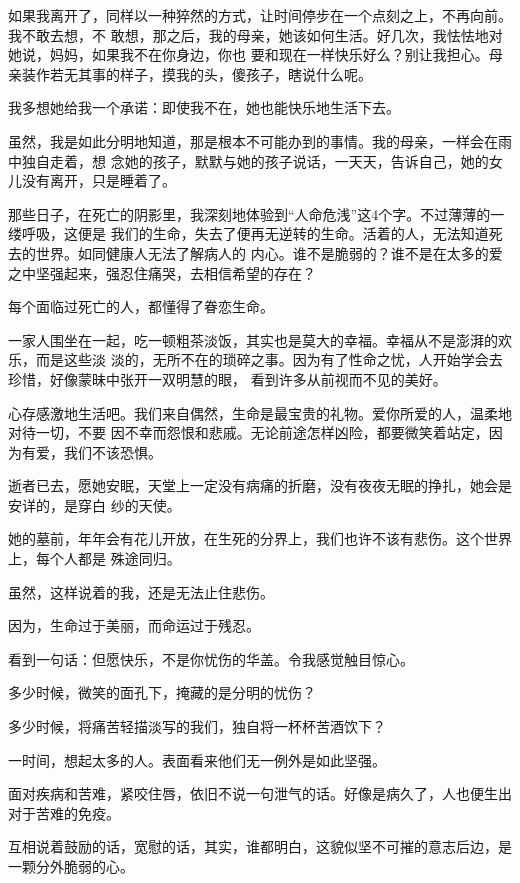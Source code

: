 		如果我离开了，同样以一种猝然的方式，让时间停步在一个点刻之上，不再向前。我不敢去想，不
	敢想，那之后，我的母亲，她该如何生活。好几次，我怯怯地对她说，妈妈，如果我不在你身边，你也
	要和现在一样快乐好么？别让我担心。母亲装作若无其事的样子，摸我的头，傻孩子，瞎说什么呢。

		我多想她给我一个承诺：即使我不在，她也能快乐地生活下去。

		虽然，我是如此分明地知道，那是根本不可能办到的事情。我的母亲，一样会在雨中独自走着，想
	念她的孩子，默默与她的孩子说话，一天天，告诉自己，她的女儿没有离开，只是睡着了。

		那些日子，在死亡的阴影里，我深刻地体验到“人命危浅”这4个字。不过薄薄的一缕呼吸，这便是
	我们的生命，失去了便再无逆转的生命。活着的人，无法知道死去的世界。如同健康人无法了解病人的
	内心。谁不是脆弱的？谁不是在太多的爱之中坚强起来，强忍住痛哭，去相信希望的存在？

		每个面临过死亡的人，都懂得了眷恋生命。

		一家人围坐在一起，吃一顿粗茶淡饭，其实也是莫大的幸福。幸福从不是澎湃的欢乐，而是这些淡
	淡的，无所不在的琐碎之事。因为有了性命之忧，人开始学会去珍惜，好像蒙昧中张开一双明慧的眼，
	看到许多从前视而不见的美好。

		心存感激地生活吧。我们来自偶然，生命是最宝贵的礼物。爱你所爱的人，温柔地对待一切，不要
	因不幸而怨恨和悲戚。无论前途怎样凶险，都要微笑着站定，因为有爱，我们不该恐惧。

		逝者已去，愿她安眠，天堂上一定没有病痛的折磨，没有夜夜无眠的挣扎，她会是安详的，是穿白
	纱的天使。

		她的墓前，年年会有花儿开放，在生死的分界上，我们也许不该有悲伤。这个世界上，每个人都是
	殊途同归。

		虽然，这样说着的我，还是无法止住悲伤。

		因为，生命过于美丽，而命运过于残忍。

	\endwriting



		看到一句话：但愿快乐，不是你忧伤的华盖。令我感觉触目惊心。

		多少时候，微笑的面孔下，掩藏的是分明的忧伤？

		多少时候，将痛苦轻描淡写的我们，独自将一杯杯苦酒饮下？

		一时间，想起太多的人。表面看来他们无一例外是如此坚强。

		面对疾病和苦难，紧咬住唇，依旧不说一句泄气的话。好像是病久了，人也便生出对于苦难的免疫。

		互相说着鼓励的话，宽慰的话，其实，谁都明白，这貌似坚不可摧的意志后边，是一颗分外脆弱的心。

